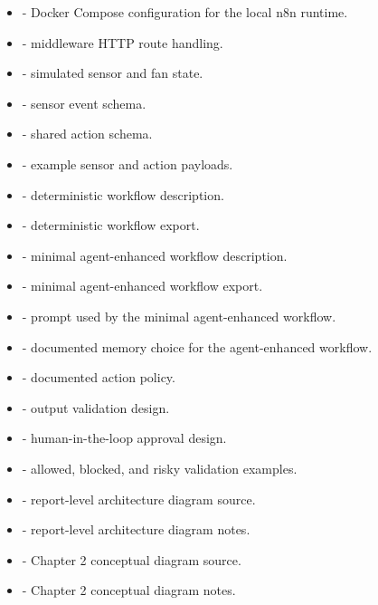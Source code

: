 \begin{itemize}
    \item {} - Docker Compose configuration for the local n8n runtime.
    \item {} - middleware HTTP route handling.
    \item {} - simulated sensor and fan state.
    \item {} - sensor event schema.
    \item {} - shared action schema.
    \item {} - example sensor and action payloads.
    \item {} - deterministic workflow description.
    \item {} - deterministic workflow export.
    \item {} - minimal agent-enhanced workflow description.
    \item {} - minimal agent-enhanced workflow export.
    \item {} - prompt used by the minimal agent-enhanced workflow.
    \item {} - documented memory choice for the agent-enhanced workflow.
    \item {} - documented action policy.
    \item {} - output validation design.
    \item {} - human-in-the-loop approval design.
    \item {} - allowed, blocked, and risky validation examples.
    \item {} - report-level architecture diagram source.
    \item {} - report-level architecture diagram notes.
    \item {} - Chapter 2 conceptual diagram source.
    \item {} - Chapter 2 conceptual diagram notes.
\end{itemize}

